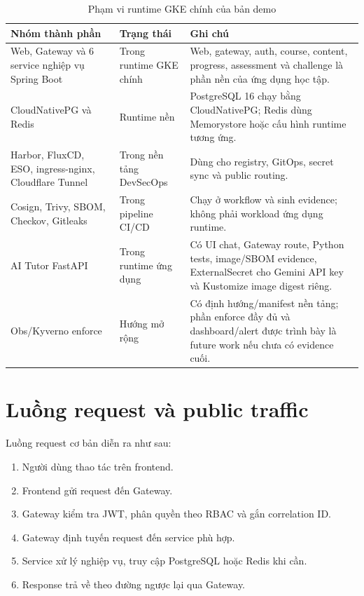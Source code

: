 \begin{table}[H]
\centering
\caption{Phạm vi runtime GKE chính của bản demo}
\label{tab:runtime-scope-final}
\begin{tabularx}{\textwidth}{|p{}|p{}|Y|}
\hline
\textbf{Nhóm thành phần} & \textbf{Trạng thái} & \textbf{Ghi chú} \\
\hline
Web, Gateway và 6 service nghiệp vụ Spring Boot & Trong runtime GKE chính & Web, gateway, auth, course, content, progress, assessment và challenge là phần nền của ứng dụng học tập. \\
CloudNativePG và Redis & Runtime nền & PostgreSQL 16 chạy bằng CloudNativePG; Redis dùng Memorystore hoặc cấu hình runtime tương ứng. \\
Harbor, FluxCD, ESO, ingress-nginx, Cloudflare Tunnel & Trong nền tảng DevSecOps & Dùng cho registry, GitOps, secret sync và public routing. \\
Cosign, Trivy, SBOM, Checkov, Gitleaks & Trong pipeline CI/CD & Chạy ở workflow và sinh evidence; không phải workload ứng dụng runtime. \\
AI Tutor FastAPI & Trong runtime ứng dụng & Có UI chat, Gateway route, Python tests, image/SBOM evidence, ExternalSecret cho Gemini API key và Kustomize image digest riêng. \\
Obs/Kyverno enforce & Hướng mở rộng & Có định hướng/manifest nền tảng; phần enforce đầy đủ và dashboard/alert được trình bày là future work nếu chưa có evidence cuối. \\
\hline
\end{tabularx}
\end{table}

\section{Luồng request và public traffic}

Luồng request cơ bản diễn ra như sau:

\begin{enumerate}
  \item Người dùng thao tác trên frontend.
  \item Frontend gửi request đến Gateway.
  \item Gateway kiểm tra JWT, phân quyền theo RBAC và gắn correlation ID.
  \item Gateway định tuyến request đến service phù hợp.
  \item Service xử lý nghiệp vụ, truy cập PostgreSQL hoặc Redis khi cần.
  \item Response trả về theo đường ngược lại qua Gateway.
\end{enumerate}

